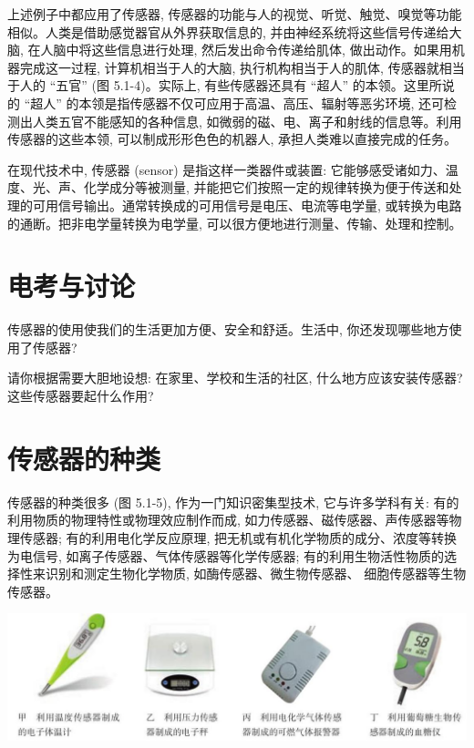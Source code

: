 \documentclass[10pt]{article}
\begin{document}
上述例子中都应用了传感器, 传感器的功能与人的视觉、听觉、触觉、嗅觉等功能相似。人类是借助感觉器官从外界获取信息的, 并由神经系统将这些信号传递给大脑, 在人脑中将这些信息进行处理, 然后发出命令传递给肌体, 做出动作。如果用机器完成这一过程, 计算机相当于人的大脑, 执行机构相当于人的肌体, 传感器就相当于人的 “五官” (图 5.1-4)。实际上, 有些传感器还具有 “超人” 的本领。这里所说的 “超人” 的本领是指传感器不仅可应用于高温、高压、辐射等恶劣环境, 还可检测出人类五官不能感知的各种信息, 如微弱的磁、电、离子和射线的信息等。利用传感器的这些本领, 可以制成形形色色的机器人, 承担人类难以直接完成的任务。

在现代技术中, 传感器 (sensor) 是指这样一类器件或装置: 它能够感受诸如力、温度、光、声、化学成分等被测量, 并能把它们按照一定的规律转换为便于传送和处理的可用信号输出。通常转换成的可用信号是电压、电流等电学量, 或转换为电路的通断。把非电学量转换为电学量, 可以很方便地进行测量、传输、处理和控制。

\section*{电考与讨论}

传感器的使用使我们的生活更加方便、安全和舒适。生活中, 你还发现哪些地方使用了传感器?

请你根据需要大胆地设想: 在家里、学校和生活的社区, 什么地方应该安装传感器? 这些传感器要起什么作用?

\section*{传感器的种类}

传感器的种类很多 (图 5.1-5), 作为一门知识密集型技术, 它与许多学科有关: 有的利用物质的物理特性或物理效应制作而成, 如力传感器、磁传感器、声传感器等物理传感器; 有的利用电化学反应原理, 把无机或有机化学物质的成分、浓度等转换为电信号, 如离子传感器、气体传感器等化学传感器; 有的利用生物活性物质的选择性来识别和测定生物化学物质, 如酶传感器、微生物传感器、 细胞传感器等生物传感器。

\begin{center}
\includegraphics[max width=1.0\textwidth]{images/01910e72-c5b7-7ed5-a6d4-fb3a5faefc32_98_799446.jpg}
\end{center}
\end{document}
